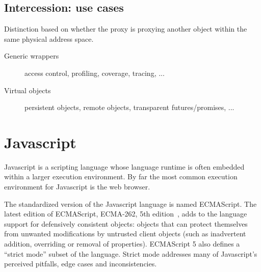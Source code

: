 \documentclass{acm_proc_article-sp}
\begin{document}

\subsection{Intercession: use cases}
\label{sub:use_cases}

Distinction based on whether the proxy is proxying another object within the same physical address space.

\begin{description}
  \item[Generic wrappers] access control, profiling, coverage, tracing, ...
  \item[Virtual objects] persistent objects, remote objects, transparent futures/promises, ...
\end{description}

\section{Javascript}

Javascript is a scripting language whose language runtime is often embedded within a larger execution environment. By far the most common execution environment for Javascript is the web browser.

The standardized version of the Javascript language is named ECMAScript. The latest edition of ECMAScript, ECMA-262, 5th edition~\cite{ECMA262}, adds to the language support for defensively consistent objects: objects that can protect themselves from unwanted modifications by untrusted client objects (such as inadvertent addition, overriding or removal of properties). ECMAScript 5 also defines a ``strict mode'' subset of the language. Strict mode addresses many of Javascript's perceived pitfalls, edge cases and inconsistencies.
\end{document}

